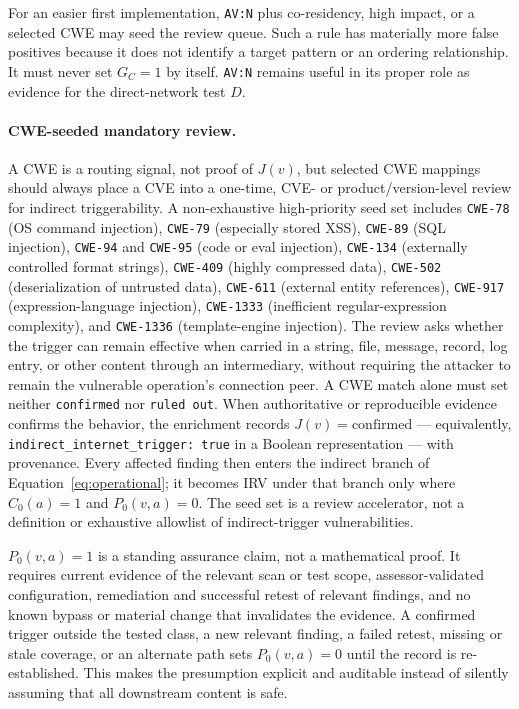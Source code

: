\documentclass[11pt]{article}
\newcommand{\code}[1]{\texttt{#1}}
\begin{document}
For an easier first implementation, \code{AV:N} plus co-residency, high impact,
or a selected CWE may seed the review queue. Such a rule has materially more
false positives because it does not identify a target pattern or an ordering
relationship. It must never set $G_C=1$ by itself. \code{AV:N} remains useful
in its proper role as evidence for the direct-network test $D$.

\paragraph{CWE-seeded mandatory review.}
A CWE is a routing signal, not proof of $J(v)$, but selected CWE mappings should
always place a CVE into a one-time, CVE- or product/version-level review for
indirect triggerability. A non-exhaustive high-priority seed set includes
\code{CWE-78} (OS command injection), \code{CWE-79} (especially stored XSS),
\code{CWE-89} (SQL injection), \code{CWE-94} and \code{CWE-95} (code or eval
injection), \code{CWE-134} (externally controlled format strings),
\code{CWE-409} (highly compressed data), \code{CWE-502} (deserialization of
untrusted data), \code{CWE-611} (external entity references), \code{CWE-917}
(expression-language injection), \code{CWE-1333} (inefficient regular-expression
complexity), and \code{CWE-1336} (template-engine injection). The review asks
whether the trigger can remain effective when carried in a string, file,
message, record, log entry, or other content through an intermediary, without
requiring the attacker to remain the vulnerable operation's connection peer.
A CWE match alone must set neither \code{confirmed} nor \code{ruled out}.
When authoritative or reproducible evidence confirms the behavior, the
enrichment records $J(v)=\mathrm{confirmed}$ --- equivalently,
\code{indirect\_internet\_trigger: true} in a Boolean representation --- with
provenance. Every affected finding then enters the indirect branch of
Equation~\ref{eq:operational}; it becomes IRV under that branch only where
$C_0(a)=1$ and $P_0(v,a)=0$. The seed set is a review accelerator, not a
definition or exhaustive allowlist of indirect-trigger vulnerabilities.

$P_0(v,a)=1$ is a standing assurance claim, not a mathematical proof. It
requires current evidence of the relevant scan or test scope, assessor-validated
configuration, remediation and successful retest of relevant findings, and no
known bypass or material change that invalidates the evidence. A confirmed
trigger outside the tested class, a new relevant finding, a failed retest,
missing or stale coverage, or an alternate path sets $P_0(v,a)=0$ until the
record is re-established. This makes the presumption explicit and auditable
instead of silently assuming that all downstream content is safe.
\end{document}
